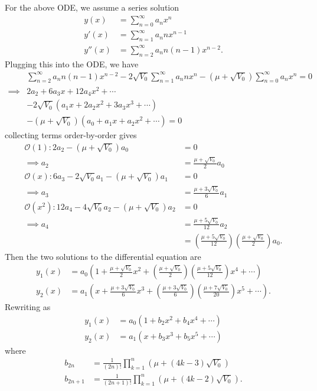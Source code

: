 \documentclass{article}
\begin{document}
\begin{itemize}
    For the above ODE, we assume a series solution
    \begin{align*}
        y(x) &= \sum_{n = 0}^{\infty}a_nx^n\\
        y'(x) &=\sum_{n = 1}^{\infty} a_n nx^{n-1}\\
        y''(x) &= \sum_{n = 2}^{\infty} a_n n (n-1)x^{n-2}.
    \end{align*}
    Plugging this into the ODE, we have
    \begin{align*}
        &\sum_{n = 2}^{\infty}a_n n(n-1)x^{n-2} - 2\sqrt{V_0}\sum_{n=1}^{\infty}a_n n x^n - (\mu + \sqrt{V_0})\sum_{n = 0}^{\infty}a_nx^n = 0\\
        \implies &2a_2 + 6a_3x + 12a_4x^2 + \cdots\\
        &- 2\sqrt{V_0}(a_1x + 2a_2x^2 + 3a_3x^3 + \cdots)\\
        &-(\mu + \sqrt{V_0})(a_0 + a_1x + a_2x^2 + \cdots) = 0
    \end{align*}
    collecting terms order-by-order gives
    \begin{align*}
        \mathcal{O}(1): 2a_2 - (\mu + \sqrt{V_0})a_0 &= 0\\
        \implies a_2 &= \frac{\mu + \sqrt{V_0}}{2}a_0\\
        \mathcal{O}(x): 6a_3 - 2\sqrt{V_0}a_1-(\mu + \sqrt{V_0})a_1 &= 0\\
        \implies a_3 &= \frac{\mu + 3\sqrt{V_0}}{6}a_1\\
        \mathcal{O}(x^2): 12a_4 - 4\sqrt{V_0}a_2 - (\mu + \sqrt{V_0})a_2 &= 0\\
        \implies a_4 &= \frac{\mu + 5\sqrt{V_0}}{12}a_2\\
        &= \left(\frac{\mu + 5\sqrt{V_0}}{12}\right)\left(\frac{\mu + \sqrt{V_0}}{2}\right)a_0.
    \end{align*}
    Then the two solutions to the differential equation are 
    \begin{align*}
        y_1(x) &= a_0\left(1 + \frac{\mu + \sqrt{V_0}}{2}x^2 + \left(\frac{\mu+\sqrt{V_0}}{2}\right)\left(\frac{\mu + 5\sqrt{V_0}}{12}\right)x^4 + \cdots\right)\\
        y_2(x) &= a_1\left(x + \frac{\mu + 3\sqrt{V_0}}{6}x^3 + \left(\frac{\mu + 3\sqrt{V_0}}{6}\right)\left(\frac{\mu + 7\sqrt{V_0}}{20}\right)x^5 + \cdots\right).
    \end{align*}
    Rewriting as
    \begin{align*}
        y_1(x) &= a_0\left(1 + b_2x^2 + b_4x^4 + \cdots\right)\\
        y_2(x) &= a_1(x + b_3x^3 + b_5x^5 + \cdots)
    \end{align*}
    where
    \begin{align*}
        b_{2n} &= \frac{1}{(2n)!}\prod_{k = 1}^n \left(\mu + (4k-3)\sqrt{V_0}\right)\\
        b_{2n+1} &= \frac{1}{(2n+1)!}\prod_{k = 1}^n\left(\mu + (4k-2)\sqrt{V_0}\right).
    \end{align*}
    

\end{itemize}
\end{document}
